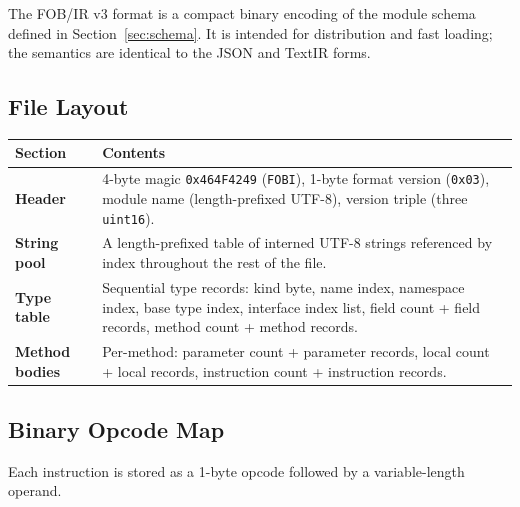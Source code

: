 \documentclass[11pt,a4paper]{article}
\begin{document}
The FOB/IR v3 format is a compact binary encoding of the module schema
defined in Section~\ref{sec:schema}. It is intended for distribution and
fast loading; the semantics are identical to the JSON and TextIR forms.

\subsection{File Layout}

\begin{longtable}{lp{9cm}}
  \toprule
  \textbf{Section} & \textbf{Contents} \\
  \midrule
  \endhead
  \textbf{Header}        &
    4-byte magic \texttt{0x464F4249} (\texttt{FOBI}), 1-byte format
    version (\texttt{0x03}), module name (length-prefixed UTF-8), version
    triple (three \texttt{uint16}). \\
  \textbf{String pool}   &
    A length-prefixed table of interned UTF-8 strings referenced by index
    throughout the rest of the file. \\
  \textbf{Type table}    &
    Sequential type records: kind byte, name index, namespace index,
    base type index, interface index list, field count + field records,
    method count + method records. \\
  \textbf{Method bodies} &
    Per-method: parameter count + parameter records, local count + local
    records, instruction count + instruction records. \\
  \bottomrule
\end{longtable}

\subsection{Binary Opcode Map}

Each instruction is stored as a 1-byte opcode followed by a variable-length
operand.
\end{document}
